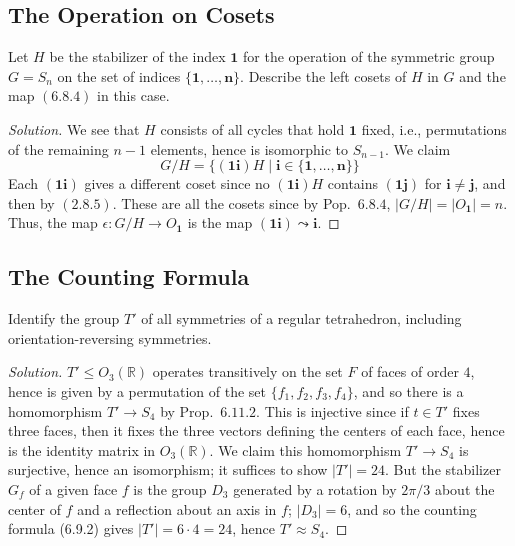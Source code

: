 \documentclass[12pt]{article}
\theoremstyle{remark}
\begin{document}
\subsection{The Operation on Cosets}
\setcounter{subsubsection}{3}
\begin{problem}\label{exc:6.8.4}
  Let $H$ be the stabilizer of the index $\mathbf{1}$ for the operation of the symmetric group $G = S_n$ on the set of indices $\{\mathbf{1},\ldots,\mathbf{n}\}$. Describe the left cosets of $H$ in $G$ and the map $(6.8.4)$ in this case.
\end{problem}
\begin{proof}[Solution]
  We see that $H$ consists of all cycles that hold $\mathbf{1}$ fixed, i.e., permutations of the remaining $n-1$ elements, hence is isomorphic to $S_{n-1}$. We claim
  \begin{equation*}
    G/H = \{(\mathbf{1}\mathbf{i})H \mid \mathbf{i} \in \{\mathbf{1},\ldots,\mathbf{n}\}\}
  \end{equation*}
  Each $(\mathbf{1}\mathbf{i})$ gives a different coset since no $(\mathbf{1}\mathbf{i})H$ contains $(\mathbf{1}\mathbf{j})$ for $\mathbf{i} \ne \mathbf{j}$, and then by $(2.8.5)$. These are all the cosets since by Pop.~$6.8.4$, $\lvert G/H \rvert = \lvert O_\mathbf{1} \rvert = n$. Thus, the map $\epsilon\colon G/H \to O_\mathbf{1}$ is the map $(\mathbf{1}\mathbf{i})\leadsto\mathbf{i}$.
\end{proof}

\subsection{The Counting Formula}
\setcounter{subsubsection}{3}
\begin{problem}
  Identify the group $T'$ of all symmetries of a regular tetrahedron, including orientation-reversing symmetries.
\end{problem}
\begin{proof}[Solution]
  $T' \leqslant O_3(\mathbb{R})$ operates transitively on the set $F$ of faces of order $4$, hence is given by a permutation of the set $\{f_1,f_2,f_3,f_4\}$, and so there is a homomorphism $T' \to S_4$ by Prop.~$6.11.2$. This is injective since if $t \in T'$ fixes three faces, then it fixes the three vectors defining the centers of each face, hence is the identity matrix in $O_3(\mathbb{R})$. We claim this homomorphism $T' \to S_4$ is surjective, hence an isomorphism; it suffices to show $\lvert T' \rvert = 24$. But the stabilizer $G_f$ of a given face $f$ is the group $D_3$ generated by a rotation by $2\pi/3$ about the center of $f$ and a reflection about an axis in $f$; $\lvert D_3 \rvert = 6$, and so the counting formula (6.9.2) gives $\lvert T' \rvert = 6 \cdot 4 = 24$, hence $T' \approx S_4$.
\end{proof}
\end{document}
